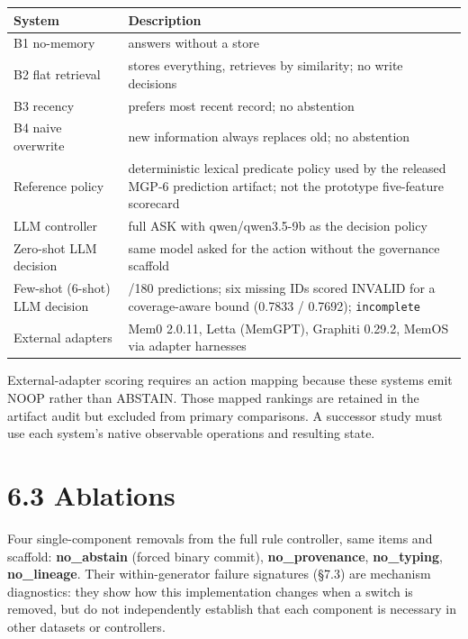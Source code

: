 {\def\LTcaptype{none} %
\begin{longtable}[]{@{}
  >{\raggedright\arraybackslash}p{}
  >{\raggedright\arraybackslash}p{}@{}}
\toprule\noalign{}
\begin{minipage}[b]{\linewidth}\raggedright
System
\end{minipage} & \begin{minipage}[b]{\linewidth}\raggedright
Description
\end{minipage} \\
\midrule\noalign{}
\endhead
\bottomrule\noalign{}
\endlastfoot
B1 no-memory & answers without a store \\
B2 flat retrieval & stores everything, retrieves by similarity; no write
decisions \\
B3 recency & prefers most recent record; no abstention \\
B4 naive overwrite & new information always replaces old; no
abstention \\
Reference policy & deterministic lexical predicate policy used by the
released MGP-6 prediction artifact; not the prototype five-feature
scorecard \\
LLM controller & full ASK with qwen/qwen3.5-9b as the decision policy \\
Zero-shot LLM decision & same model asked for the action without the
governance scaffold \\
Few-shot (6-shot) LLM decision & 174/180 predictions; six missing IDs
scored INVALID for a coverage-aware bound (0.7833 / 0.7692);
\texttt{incomplete} \\
External adapters & Mem0 2.0.11, Letta (MemGPT), Graphiti 0.29.2, MemOS
via adapter harnesses \\
\end{longtable}
}

External-adapter scoring requires an action mapping because these
systems emit NOOP rather than ABSTAIN. Those mapped rankings are
retained in the artifact audit but excluded from primary comparisons. A
successor study must use each system's native observable operations and
resulting state.

\section{6.3 Ablations}\label{ablations}

Four single-component removals from the full rule controller, same items
and scaffold: \textbf{no\_abstain} (forced binary commit),
\textbf{no\_provenance}, \textbf{no\_typing}, \textbf{no\_lineage}.
Their within-generator failure signatures (§7.3) are mechanism
diagnostics: they show how this implementation changes when a switch is
removed, but do not independently establish that each component is
necessary in other datasets or controllers.

